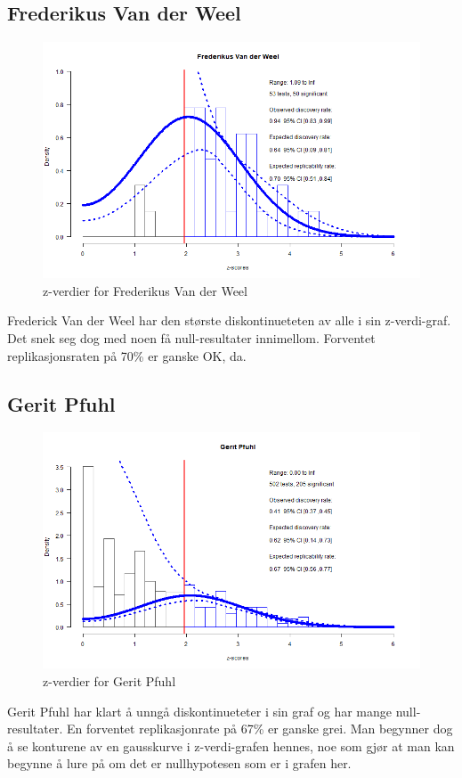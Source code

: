 \documentclass[doc,norsk]{apa7}
\begin{document}
\subsection{Frederikus Van der Weel}
\begin{figure}[h!]
    \centering
    \includegraphics[width=\textwidth]{images/Frederikus Van der Weel.png}
    \caption{z-verdier for Frederikus Van der Weel}
\end{figure}
Frederick Van der Weel har den største diskontinueteten av alle i sin z-verdi-graf. Det snek seg dog med noen få null-resultater innimellom. Forventet replikasjonsraten på 70\% er ganske OK, da.

\subsection{Gerit Pfuhl}
\begin{figure}[h!]
    \centering
    \includegraphics[width=\textwidth]{images/Gerit Pfuhl.png}
    \caption{z-verdier for Gerit Pfuhl}
\end{figure}
Gerit Pfuhl har klart å unngå diskontinueteter i sin graf og har mange null-resultater. En forventet replikasjonrate på 67\% er ganske grei. Man begynner dog å se konturene av en gausskurve i z-verdi-grafen hennes, noe som gjør at man kan begynne å lure på om det er nullhypotesen som er i grafen her.
\end{document}
